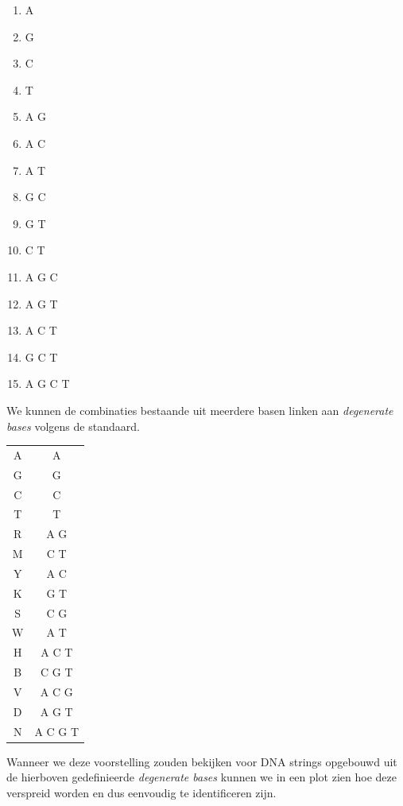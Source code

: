 \documentclass{esannV2}
\begin{document}
\begin{center}
\begin{multicols}{3}
	
\begin{enumerate}
\item A
\item G
\item C
\item T
\item A G
\item A C
\item A T
\item G C
\item G T
\item C T
\item A G C
\item A G T
\item A C T
\item G C T
\item A G C T
\end{enumerate}

\end{multicols}
\end{center}

We kunnen de combinaties bestaande uit meerdere basen linken aan \textit{degenerate bases} volgens de standaard.

\begin{center}
\begin{tabular}{ c | c }
	A & A \\
	G & G \\
	C & C \\
	T & T \\
	R & A G\\
	M & C T\\
	Y & A C\\
	K & G T\\
	S & C G\\
	W & A T\\
	H & A C T\\
	B & C G T\\
	V & A C G\\
	D & A G T\\
	N & A C G T\\
\end{tabular}
\end{center}

Wanneer we deze voorstelling zouden bekijken voor DNA strings opgebouwd uit de hierboven gedefinieerde \textit{degenerate bases} kunnen we in een plot zien hoe deze verspreid worden en dus eenvoudig te identificeren zijn.
\end{document}

